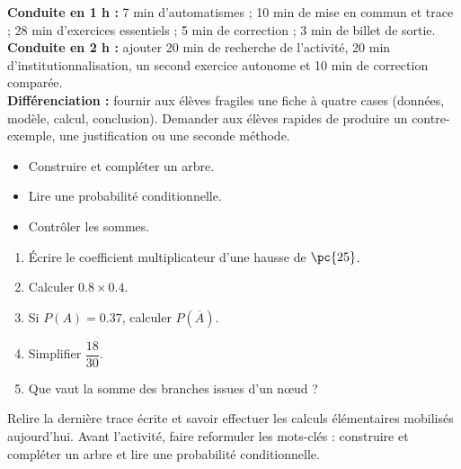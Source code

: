 \ifmxteacher
\begin{method}
\textbf{Conduite en 1 h :} 7 min d'automatismes ; 10 min de mise en commun et trace ; 28 min d'exercices essentiels ; 5 min de correction ; 3 min de billet de sortie.\\
\textbf{Conduite en 2 h :} ajouter 20 min de recherche de l'activité, 20 min d'institutionnalisation, un second exercice autonome et 10 min de correction comparée.\\
\textbf{Différenciation :} fournir aux élèves fragiles une fiche à quatre cases (données, modèle, calcul, conclusion). Demander aux élèves rapides de produire un contre-exemple, une justification ou une seconde méthode.
\end{method}
\fi
{}
    \begin{objectives}\begin{itemize}\item Construire et compléter un arbre.\item Lire une probabilité conditionnelle.\item Contrôler les sommes.\end{itemize}\end{objectives}
    \begin{fluency}\begin{enumerate}\item Écrire le coefficient multiplicateur d'une hausse de $\pc{25}$. \item Calculer $\num{0,8}\times\num{0,4}$. \item Si $P(A)=\num{0,37}$, calculer $P(\overline A)$. \item Simplifier $\dfrac{18}{30}$. \item Que vaut la somme des branches issues d'un nœud ? \end{enumerate}\end{fluency}
    \begin{prerequisites}Relire la dernière trace écrite et savoir effectuer les calculs élémentaires mobilisés aujourd'hui. Avant l'activité, faire reformuler les mots-clés : construire et compléter un arbre et lire une probabilité conditionnelle.\end{prerequisites}

